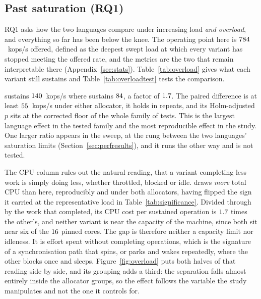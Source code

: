 \documentclass[english,oneside,a4paper,censored,csm,software-track-2020]{HYthesisML}
\begin{document}
\subsection{Past saturation (RQ1)}\label{sec:overload}
RQ1 asks how the two languages compare under increasing load \emph{and overload}, and everything
so far has been below the knee. The operating point here is $784$~kops/s offered,
defined as the deepest swept load at which every variant has stopped meeting the offered rate,
and the metrics are the two that remain interpretable there (Appendix~\ref{sec:stats}).
Table~\ref{tab:overload} gives what each variant still sustains and
Table~\ref{tab:overloadtest} tests the comparison.

\OverloadSustainedFaster{} sustains $140$~kops/s where \OverloadSustainedSlower{}
sustains $84$, a factor of $1.7$. The paired difference is at least
$55$~kops/s under either allocator, it holds in \OverloadThrAgree{} repeats, and
its Holm-adjusted $p$ sits at the corrected floor of the whole family of \NTests{} tests. This is
the largest language effect in the tested family and the most reproducible effect in the study.
One larger ratio appears in the sweep, at the rung between the two languages' saturation limits
(Section~\ref{sec:perfresults}), and it runs the other way and is not tested.

The CPU column rules out the natural reading, that a variant completing less work is simply doing
less, whether throttled, blocked or idle. \OverloadSustainedSlower{} draws \emph{more} total CPU
than \OverloadSustainedFaster{} here, reproducibly and under both allocators, having flipped the
sign it carried at the representative load in Table~\ref{tab:significance}. Divided through by
the work that completed, its CPU cost per sustained operation is $1.7$ times
the other's, and neither variant is near the capacity of the machine, since both sit near six of
the $16$ pinned cores. The gap is therefore neither a capacity limit nor idleness.
It is effort spent without completing operations, which is the signature of a synchronisation
path that spins, or parks and wakes repeatedly, where the other blocks once and sleeps.
Figure~\ref{fig:overload} puts both halves of that reading side by side, and its grouping adds a
third: the separation falls almost entirely inside the allocator groups, so the effect follows the
variable the study manipulates and not the one it controls for.
\end{document}
